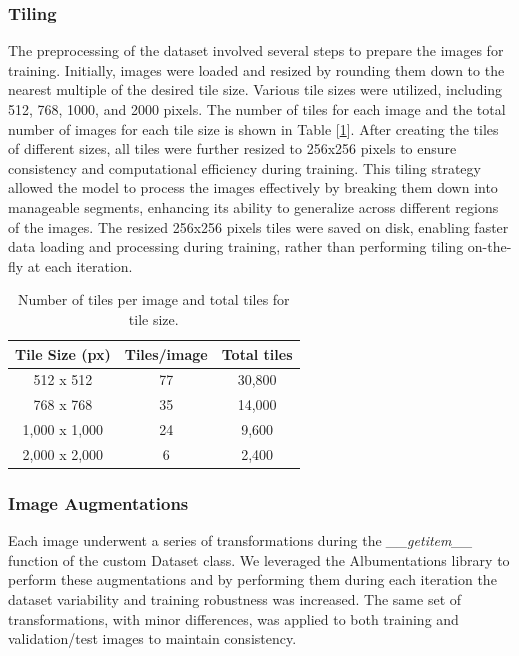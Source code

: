 \documentclass[a4paper]{article}
\begin{document}
\subsubsection{Tiling}
The preprocessing of the dataset involved several steps to prepare the images for training. Initially, images were loaded and resized by rounding them down to the nearest multiple of the desired tile size. Various tile sizes were utilized, including 512, 768, 1000, and 2000 pixels. The number of tiles for each image and the total number of images for each tile size is shown in Table [\ref{table:number_of_tiles_and_total_tiles}]. After creating the tiles of different sizes, all tiles were further resized to 256x256 pixels to ensure consistency and computational efficiency during training. This tiling strategy allowed the model to process the images effectively by breaking them down into manageable segments, enhancing its ability to generalize across different regions of the images. The resized 256x256 pixels tiles were saved on disk, enabling faster data loading and processing during training, rather than performing tiling on-the-fly at each iteration.

\begin{table}[h]
\centering
\begin{tabular}{|c|c|c|}
\hline
\textbf{Tile Size (px)} & \textbf{Tiles/image} & \textbf{Total tiles} \\ \hline
512 x 512 & 77 & 30,800 \\ \hline
768 x 768 & 35 & 14,000 \\ \hline
1,000 x 1,000 & 24 & 9,600 \\ \hline
2,000 x 2,000 & 6 & 2,400 \\ \hline
\end{tabular}
\caption{Number of tiles per image and total tiles for tile size.}
\label{table:number_of_tiles_and_total_tiles}
\end{table}

\subsubsection{Image Augmentations}
Each image underwent a series of transformations during the \textit{\_\_getitem\_\_} function of the custom Dataset class. We leveraged the Albumentations library to perform these augmentations and by performing them during each iteration the dataset variability and training robustness was increased. The same set of transformations, with minor differences, was applied to both training and validation/test images to maintain consistency.
\end{document}
